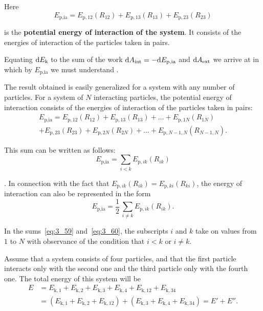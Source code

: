 \noindent
Here
\begin{equation}\label{eq:3_57}
E_{\text{p,ia}} = E_{\text{p},12}(R_{12}) + E_{\text{p},13}(R_{13}) + E_{\text{p},23}(R_{23})
\end{equation}

\noindent
is the \textbf{potential energy of interaction of the system}. It consists of the energies of interaction of the particles taken in pairs.

Equating $\mathrm{d} E_{\text{k}}$ to the sum of the work $\mathrm{d} A_{\text{int}}=-\mathrm{d} E_{\text{p,ia}}$ and $\mathrm{d} A_{\text{ext}}$ we arrive at  in which by $E_{\text{p,ia}}$ we must understand .

The result obtained is easily generalized for a system with any number of particles. For a system of $N$ interacting particles, the potential energy of interaction consists of the energies of interaction of the particles taken in pairs:
\begin{multline}\label{eq:3_58}
E_{\text{p,ia}} = E_{\text{p},12}(R_{12}) + E_{\text{p},13}(R_{13}) + \ldots + E_{\text{p},1N}(R_{1N})\\
+ E_{\text{p},23}(R_{23}) + E_{\text{p},2N}(R_{2N}) + \ldots + E_{\text{p},N-1,N}(R_{N-1,N}).
\end{multline}

\noindent
This sum can be written as follows:
\begin{equation}\label{eq:3_59}
E_{\text{p,ia}} = \sum_{i<k} E_{\text{p},ik}(R_{ik})
\end{equation}

. In connection with the fact that $E_{\text{p},ik}(R_{ik})=E_{\text{p},ki}(R_{ki})$, the energy of interaction can also be represented in the form
\begin{equation}\label{eq:3_60}
E_{\text{p,ia}} = \frac{1}{2}\,\sum_{i\neq k} E_{\text{p},ik}(R_{ik}).
\end{equation}

\noindent
In the sums~\eqref{eq:3_59} and~\eqref{eq:3_60}, the subscripts $i$ and $k$ take on values from $1$ to $N$ with observance of the condition that $i<k$ or $i\neq k$.

Assume that a system consists of four particles, and that the first particle interacts only with the second one and the third particle only with the fourth one. The total energy of this system will be
\begin{align}
E &= E_{\text{k},1} + E_{\text{k},2} + E_{\text{k},3} + E_{\text{k},4} + E_{\text{k},12} + E_{\text{k},34}\nonumber\\
&= (E_{\text{k},1} + E_{\text{k},2} + E_{\text{k},12}) + (E_{\text{k},3} + E_{\text{k},4} + E_{\text{k},34}) = E' + E''. \label{eq:3_61}
\end{align}

